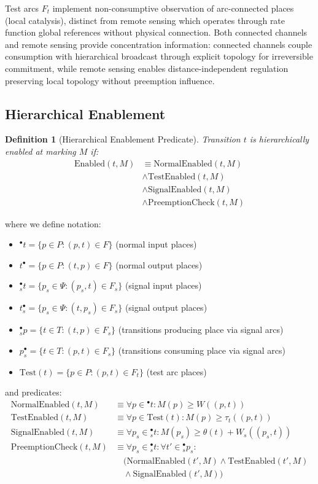 \documentclass[10pt,letterpaper]{article}
\newtheorem{definition}{Definition}
\begin{document}
Test arcs $F_t$ implement non-consumptive observation of arc-connected places (local catalysis), distinct from remote sensing which operates through rate function global references without physical connection. Both connected channels and remote sensing provide concentration information: connected channels couple consumption with hierarchical broadcast through explicit topology for irreversible commitment, while remote sensing enables distance-independent regulation preserving local topology without preemption influence.

\subsection{Hierarchical Enablement}

\begin{definition}[Hierarchical Enablement Predicate]
Transition $t$ is hierarchically enabled at marking $M$ if:
\begin{align}
\text{Enabled}(t, M) &\equiv \text{NormalEnabled}(t,M) \nonumber \\
&\wedge \text{TestEnabled}(t,M) \nonumber \\
&\wedge \text{SignalEnabled}(t,M) \nonumber \\
&\wedge \text{PreemptionCheck}(t,M)
\end{align}
\end{definition}

where we define notation:
\begin{itemize}
\item ${}^\bullet t = \{p \in P : (p,t) \in F\}$ (normal input places)
\item $t^\bullet = \{p \in P : (t,p) \in F\}$ (normal output places)
\item ${}^\bullet_s t = \{p_s \in \Psi : (p_s,t) \in F_s\}$ (signal input places)
\item $t^\bullet_s = \{p_s \in \Psi : (t,p_s) \in F_s\}$ (signal output places)
\item ${}^\bullet_s p = \{t \in T : (t,p) \in F_s\}$ (transitions producing place via signal arcs)
\item $p^\bullet_s = \{t \in T : (p,t) \in F_s\}$ (transitions consuming place via signal arcs)
\item $\text{Test}(t) = \{p \in P : (p,t) \in F_t\}$ (test arc places)
\end{itemize}

and predicates:
\begin{align}
\text{NormalEnabled}(t,M) &\equiv \forall p \in {}^\bullet t: M(p) \geq W((p,t)) \\
\text{TestEnabled}(t,M) &\equiv \forall p \in \text{Test}(t): M(p) \geq \tau_t((p,t)) \\
\text{SignalEnabled}(t,M) &\equiv \forall p_s \in {}^\bullet_s t: M(p_s) \geq \theta(t) + W_s((p_s,t)) \\
\text{PreemptionCheck}(t,M) &\equiv \forall p_s \in {}^\bullet_s t: \forall t' \in {}^{\bullet}_s p_s: \nonumber \\
&\quad (\text{NormalEnabled}(t',M) \wedge \text{TestEnabled}(t',M) \nonumber \\
&\quad \wedge \text{SignalEnabled}(t',M))
\end{align}
\end{document}
